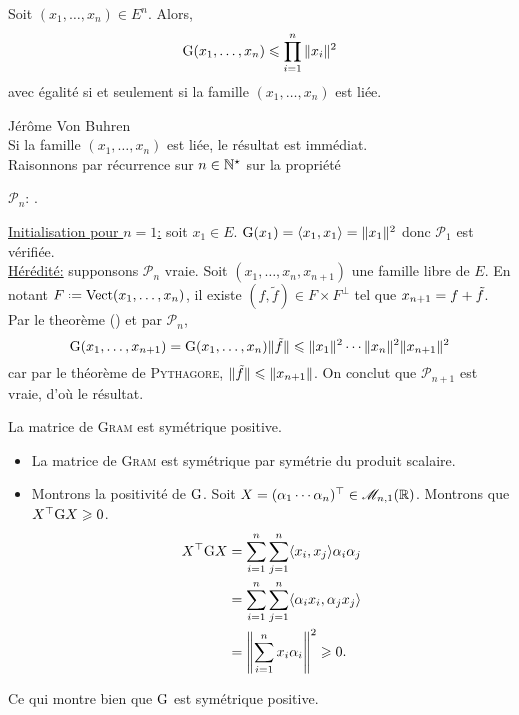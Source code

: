 \begin{corol} \label{inegalite_gram}
    Soit $(x_1, \dots, x_n) \in E^n$. Alors,
    $$\mathrm{G}(x_1, \dots, x_n) \leqslant \prod_{i=1}^n \Vert x_i \Vert^2$$
    avec égalité si et seulement si la famille $(x_1, \dots, x_n)$ est liée. 
\end{corol}

\begin{preuve}
Jérôme Von Buhren \\
    Si la famille $(x_1, \dots, x_n)$ est liée, le résultat est immédiat. \\
    Raisonnons par récurrence sur $n \in \mathbb{N}^\star$ sur la propriété
    \begin{center}
        $\mathscr{P}_n$: .
    \end{center}
    \underline{Initialisation pour $n = 1$:} soit $x_1 \in E$. $\mathrm{G}(x_1) = \langle x_1, x_1 \rangle = \Vert x_1 \Vert^2$ donc $\mathscr{P}_1$ est vérifiée. \\
    \underline{Hérédité:} supponsons $\mathscr{P}_n$ vraie. Soit $(x_1, \dots, x_n, x_{n+1})$ une famille libre de $E$. En notant $F \defeq \Vect(x_1, \dots, x_n)$, il existe $(f, \tilde{f}) \in F \times F^\perp$ tel que $x_{n+1} = f + \Tilde{f}$. Par le theorème () et par $\mathscr{P}_n$, 
    $$\mathrm{G}(x_1, \dots, x_{n+1}) = \mathrm{G}(x_1, \dots, x_n) \Vert \tilde{f} \Vert \leqslant \Vert x_1 \Vert^2 \cdots \Vert x_n \Vert^2 \Vert x_{n+1} \Vert^2$$
    car par le théorème de \textsc{Pythagore}, $\Vert \tilde{f} \Vert \leqslant \Vert x_{n+1} \Vert$. On conclut que $\mathscr{P}_{n+1}$ est vraie, d'où le résultat. 
\end{preuve}

\begin{prop}
    La matrice de \textsc{Gram} est symétrique positive.
\end{prop}

\begin{preuve}
    \begin{itemize}
        \item La matrice de \textsc{Gram} est symétrique par symétrie du produit scalaire.
        \item Montrons la positivité de $\mathrm{G}$. Soit $X = (\alpha_1 \cdots \alpha_n)^\top \in \mathscr{M}_{n,1}(\mathbb{R})$. Montrons que $X^\top \mathrm{G} X \geqslant 0$. 
        \begin{align*}
            X^\top \mathrm{G} X &= \sum_{i=1}^{n} \sum_{j=1}^{n} \langle x_i, x_j \rangle \alpha_i \alpha_j \\ 
            &= \sum_{i=1}^{n} \sum_{j=1}^{n} \langle \alpha_i x_i, \alpha_j x_j \rangle \\
            &= \left\Vert \sum_{i=1}^{n}x_i \alpha_i \right\Vert^2 \geqslant 0.
        \end{align*}
    \end{itemize}
   
    Ce qui montre bien que $\mathrm{G}$ est symétrique positive.
\end{preuve}

